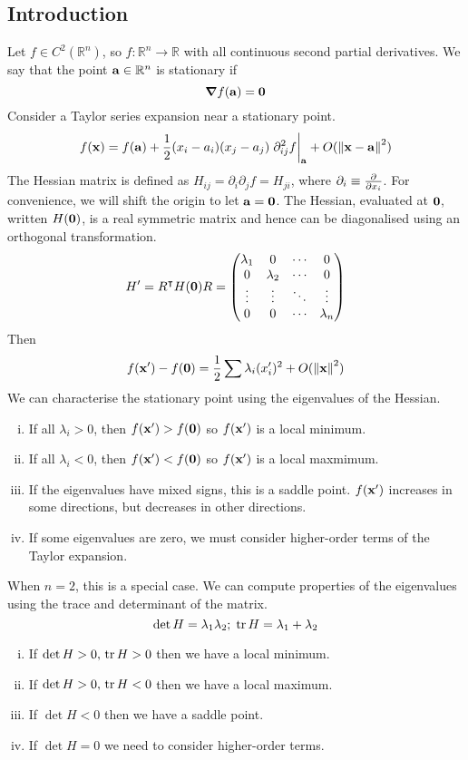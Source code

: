 \subsection{Introduction}
Let \(f \in C^2(\mathbb R^n)\), so \(f \colon \mathbb R^n \to \mathbb R\) with all continuous second partial derivatives.
We say that the point \( \vb a \in \mathbb R^n \) is stationary if
\[
	\grad{f(\vb a)} = \vb 0
\]
Consider a Taylor series expansion near a stationary point.
\[
	f(\vb x) = f(\vb a) + \frac{1}{2} (x_i - a_i)(x_j - a_j) \eval{\partial^2_{ij} f}_{\vb a} + O(\norm{\vb x - \vb a}^2)
\]
The Hessian matrix is defined as \(H_{ij} = \partial_i \partial_j f = H_{ji}\), where \(\partial_i \equiv \pdv{}{x_i}\).
For convenience, we will shift the origin to let \(\vb a = \vb 0\).
The Hessian, evaluated at \(\vb 0\), written \(H(\vb 0)\), is a real symmetric matrix and hence can be diagonalised using an orthogonal transformation.
\[
	H' = R^\intercal H(\vb 0) R = \begin{pmatrix}
		\lambda_1 & 0         & \cdots & 0         \\
		0         & \lambda_2 & \cdots & 0         \\
		\vdots    & \vdots    & \ddots & \vdots    \\
		0         & 0         & \cdots & \lambda_n
	\end{pmatrix}
\]
Then
\[
	f(\vb x') - f(\vb 0) = \frac{1}{2} \sum \lambda_i (x_i')^2 + O(\norm{\vb x}^2)
\]
We can characterise the stationary point using the eigenvalues of the Hessian.
\begin{enumerate}[(i)]
	\item If all \(\lambda_i > 0\), then \(f(\vb x') > f(\vb 0)\) so \(f(\vb x')\) is a local minimum.
	\item If all \(\lambda_i < 0\), then \(f(\vb x') < f(\vb 0)\) so \(f(\vb x')\) is a local maxmimum.
	\item If the eigenvalues have mixed signs, this is a saddle point.
	      \(f(\vb x')\) increases in some directions, but decreases in other directions.
	\item If some eigenvalues are zero, we must consider higher-order terms of the Taylor expansion.
\end{enumerate}
When \(n = 2\), this is a special case.
We can compute properties of the eigenvalues using the trace and determinant of the matrix.
\[
	\det H = \lambda_1 \lambda_2;\;\tr H = \lambda_1 + \lambda_2
\]
\begin{enumerate}[(i)]
	\item If \(\det H > 0,\,\tr H > 0\) then we have a local minimum.
	\item If \(\det H > 0,\,\tr H < 0\) then we have a local maximum.
	\item If \(\det H < 0\) then we have a saddle point.
	\item If \(\det H = 0\) we need to consider higher-order terms.
\end{enumerate}

